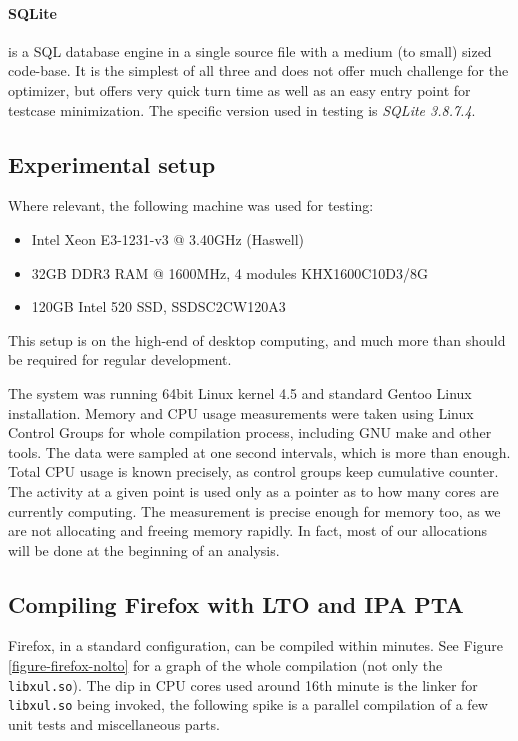 \paragraph{SQLite} is a SQL database engine in a single source file with a
medium (to small) sized code-base. It is the simplest of all three and does not
offer much challenge for the optimizer, but offers very quick turn time as well
as an easy entry point for testcase minimization. The specific version used in
testing is {\it SQLite 3.8.7.4}.

\subsection{Experimental setup}

Where relevant, the following machine was used for testing:

\begin{itemize}
	\item Intel Xeon E3-1231-v3 @ 3.40GHz (Haswell)
	\item 32GB DDR3 RAM @ 1600MHz, 4 modules KHX1600C10D3/8G
	\item 120GB Intel 520 SSD, SSDSC2CW120A3
\end{itemize}

This setup is on the high-end of desktop computing, and much more than
should be required for regular development. 

The system was running 64bit Linux kernel 4.5 and standard Gentoo Linux
installation. Memory and CPU usage measurements were taken using Linux Control
Groups for whole compilation process, including GNU make and other tools. The
data were sampled at one second intervals, which is more than enough. Total CPU
usage is known precisely, as control groups keep cumulative counter. The
activity at a given point is used only as a pointer as to how many cores are
currently computing. The measurement is precise enough for memory too, as
we are not allocating and freeing memory rapidly. In fact, most of our
allocations will be done at the beginning of an analysis.

\subsection{Compiling Firefox with LTO and IPA PTA}
\label{section-firefox-lto-pta}

Firefox, in a standard configuration, can be compiled within minutes. See Figure
\ref{figure-firefox-nolto} for a graph of the whole compilation (not only the
{\tt libxul.so}). The dip in CPU cores used around 16th minute is the linker for
{\tt libxul.so} being invoked, the following spike is a parallel compilation of a few
unit tests and miscellaneous parts.

